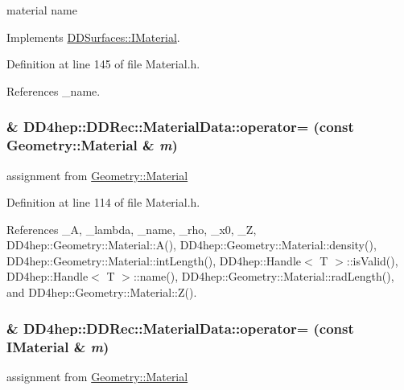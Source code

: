 material name 

Implements \hyperlink{class_d_d_surfaces_1_1_i_material_a2ae91470bda1952ae8dbcef59d655540}{DDSurfaces::IMaterial}.

Definition at line 145 of file Material.h.

References \_\-name.\hypertarget{class_d_d4hep_1_1_d_d_rec_1_1_material_data_acd13fcfbed46538127af9d018960e906}{
\subsubsection[{operator=}]{\& DD4hep::DDRec::MaterialData::operator= (const {\bf Geometry::Material} \& {\em m})}}
\label{class_d_d4hep_1_1_d_d_rec_1_1_material_data_acd13fcfbed46538127af9d018960e906}


assignment from \hyperlink{class_d_d4hep_1_1_geometry_1_1_material}{Geometry::Material} 

Definition at line 114 of file Material.h.

References \_\-A, \_\-lambda, \_\-name, \_\-rho, \_\-x0, \_\-Z, DD4hep::Geometry::Material::A(), DD4hep::Geometry::Material::density(), DD4hep::Geometry::Material::intLength(), DD4hep::Handle$<$ T $>$::isValid(), DD4hep::Handle$<$ T $>$::name(), DD4hep::Geometry::Material::radLength(), and DD4hep::Geometry::Material::Z().\hypertarget{class_d_d4hep_1_1_d_d_rec_1_1_material_data_a7340be27bee4c64179f6114d698c7f65}{
\subsubsection[{operator=}]{\& DD4hep::DDRec::MaterialData::operator= (const {\bf IMaterial} \& {\em m})}}
\label{class_d_d4hep_1_1_d_d_rec_1_1_material_data_a7340be27bee4c64179f6114d698c7f65}


assignment from \hyperlink{class_d_d4hep_1_1_geometry_1_1_material}{Geometry::Material} 

